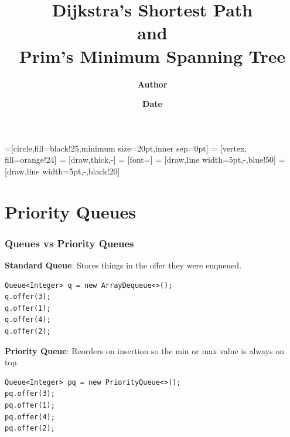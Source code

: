 \documentclass{beamer}
\title{\textbf{Dijkstra's Shortest Path\\ and\\ Prim's Minimum Spanning Tree}}
\author{\textbf{Author}}
\institute[\textbf{UIUC}]{\textbf{University of Illinois Urbana-Champaign}}
\date{\textbf{Date}}
\begin{document}

=[circle,fill=black!25,minimum size=20pt,inner sep=0pt]
 = [vertex, fill=orange!24]
 = [draw,thick,-]
 = [font=\small]
 = [draw,line width=5pt,-,blue!50]
 = [draw,line width=5pt,-,black!20]


\frame{\titlepage}

\section{Priority Queues}

\begin{frame}[fragile]
    \frametitle{Queues vs Priority Queues}
    \begin{minipage}{0.47\textwidth}
        {\centering \textbf{Standard Queue}: Stores things in the offer they were enqueued.}
        \begin{figure}[H]
        \end{figure}
        \begin{lstlisting}
Queue<Integer> q = new ArrayDequeue<>();
q.offer(3); 
q.offer(1);
q.offer(4);
q.offer(2);
        \end{lstlisting}
        \vspace{1cm}
    \end{minipage}
    \hfill
    \vline
    \hfill
    \begin{minipage}{0.47\textwidth}
        \textbf{Priority Queue}: Reorders on insertion so the min or max value is always on top.\\
        \vspace{-0.2cm}
        \begin{figure}[H]
            \centering
            \scalebox{0.75}{
                
            }
        \end{figure}
        \vspace{-0.2cm}
        \begin{lstlisting}
Queue<Integer> pq = new PriorityQueue<>();
pq.offer(3); 
pq.offer(1);
pq.offer(4);
pq.offer(2);
        \end{lstlisting}
    \end{minipage}
\end{frame}
\end{document}
